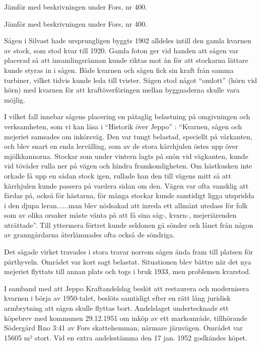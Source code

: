 Jämför med beskrivningen under Fors, nr 400.\jhvspace{}

Jämför med beskrivningen under Fors, nr 400.\jhvspace{}


%

\jhnooccupant{}

Sågen i Silvast hade ursprungligen byggts 1902 alldeles intill den gamla kvarnen av stock, som stod kvar till 1920. Gamla foton ger vid handen att sågen var placerad så att insamlingsrännan kunde riktas mot ån för att stockarna lättare kunde styras in i sågen. Både kvarnen och sågen fick sin kraft från samma turbiner, vilket tidvis kunde leda till tvister. Sågen stod något ``omlott'' (hörn vid hörn) med kvarnen för att kraftöverföringen mellan byggnaderna skulle vara möjlig.

I vilket fall innebar sågens placering en påtaglig belastning på omgivningen och verksamheten, som vi kan läsa i ``Historik över Jeppo'' : ``Kvarnen, sågen och mejeriet samsades om inkörsväg. Den var tungt belastad, speciellt på vårkanten, och blev snart en enda lervälling, som av de stora kärrhjulen östes upp över mjölkkannorna. Stockar som under vintern lagts på snön vid vägkanten, kunde vid töväder rulla ner på vägen och hindra framkomligheten. Om hästkusken inte orkade få upp en sådan stock igen, rullade han den till vägens mitt så att kärrhjulen kunde passera på vardera sidan om den. Vägen var ofta vansklig att färdas på, också för hästarna, för många stockar kunde samtidigt ligga utspridda i den djupa leran......man blev nödsakad att inreda ett allmänt utedass för folk som av olika orsaker måste vänta på att få sina såg-, kvarn-, mejeriärenden uträttade''. Till yttermera förtret kunde seldonen gå sönder och lånet från någon av granngårdarna återlämnades ofta också de söndriga.

Det sågade virket travades i stora travar norrom sågen ända fram till platsen för pärthyveln. Området var kort sagt belastat. Situationen blev bättre när det nya mejeriet flyttats till annan plats och togs i bruk 1933, men problemen kvarstod.

I samband med att Jeppo Kraftandelslag beslöt att restaurera och modernisera kvarnen i börja av 1950-talet, beslöts samtidigt efter en rätt lång juridisk armbrytning att sågen skulle flyttas bort. Andelslaget undertecknade ett köpebrev med kommunen 29.12.1951 om inköp av ett markområde, tillhörande Södergård Rno 3:41 av Fors skattehemman, närmare järnvägen. Området var 15605 m² stort. Vid en extra andelsstämma den 17 jan. 1952 godkändes köpet.

